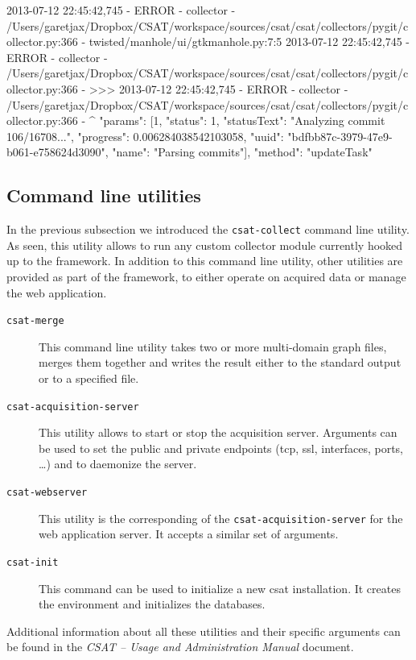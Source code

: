 \begin{cmdresult}[basicstyle=\tiny\ttfamily]
2013-07-12 22:45:42,745 - ERROR - collector - /Users/garetjax/Dropbox/CSAT/workspace/sources/csat/csat/collectors/pygit/collector.py:366 - twisted/manhole/ui/gtkmanhole.py:7:5
2013-07-12 22:45:42,745 - ERROR - collector - /Users/garetjax/Dropbox/CSAT/workspace/sources/csat/csat/collectors/pygit/collector.py:366 - >>>
2013-07-12 22:45:42,745 - ERROR - collector - /Users/garetjax/Dropbox/CSAT/workspace/sources/csat/csat/collectors/pygit/collector.py:366 -         ^
{"params": [1, {"status": 1, "statusText": "Analyzing commit 106/16708...", "progress": 0.006284038542103058, "uuid": "bdfbb87c-3979-47e9-b061-e758624d3090", "name": "Parsing commits"}], "method": "updateTask"}
\end{cmdresult}


\subsection{Command line utilities}

In the previous subsection we introduced the \texttt{csat-collect} command line utility. As seen, this utility allows to run any custom collector module currently hooked up to the framework. In addition to this command line utility, other utilities are provided as part of the framework, to either operate on acquired data or manage the web application.

\begin{description}
  \item[\texttt{csat-merge}] 
    This command line utility takes two or more multi-domain graph files, merges them together and writes the result either to the standard output or to a specified file.
  \item[\texttt{csat-acquisition-server}] This utility allows to start or stop the acquisition server. Arguments can be used to set the public and private endpoints (\gls{tcp}, \gls{ssl}, interfaces, ports, \ldots) and to daemonize the server.
  \item[\texttt{csat-webserver}] This utility is the corresponding of the \texttt{csat-acquisition-server} for the web application server. It accepts a similar set of arguments.
  \item[\texttt{csat-init}] This command can be used to initialize a new \gls{csat} installation. It creates the environment and initializes the databases.
\end{description}

Additional information about all these utilities and their specific arguments can be found in the \emph{CSAT -- Usage and Administration Manual} document.

